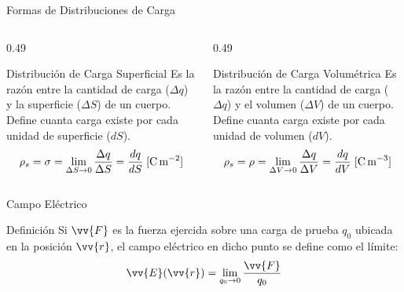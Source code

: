 \documentclass[10pt, aspectratio=169]{beamer}
\begin{document}
\begin{frame}{Formas de Distribuciones de Carga}

    \begin{columns}
        \begin{column}{0.49\textwidth}
            \begin{boxTeoria}{Distribución de Carga Superficial}
                Es la razón entre la cantidad de carga ($\Delta q$) y la superficie ($\Delta S$) de un cuerpo.
                Define cuanta carga existe por cada unidad de superficie ($dS$).
                \begin{equation*}
                    \rho_s = \sigma = \lim_{\Delta S\to 0}\frac{\Delta q}{\Delta S} = \frac{dq}{dS} \;[\unit{\C\per\m\squared}]
                \end{equation*}
            \end{boxTeoria}
        \end{column}
        \hfill
        \begin{column}{0.49\textwidth}
            \begin{boxTeoria}{Distribución de Carga Volumétrica}
                Es la razón entre la cantidad de carga ($\Delta q$) y el volumen ($\Delta V$) de un cuerpo.
                Define cuanta carga existe por cada unidad de volumen ($dV$).
                \begin{equation*}
                    \rho_s = \rho = \lim_{\Delta V\to 0}\frac{\Delta q}{\Delta V} = \frac{dq}{dV} \;[\unit{\C\per\m\cubed}]
                \end{equation*}
            \end{boxTeoria}
        \end{column}
    \end{columns}

\end{frame}

\begin{frame}{Campo Eléctrico}
    \begin{boxTeoria}{Definición}
        Si $\vv{F}$ es la fuerza ejercida sobre una carga de prueba $q_0$ ubicada en la posición $\vv{r}$, el campo eléctrico en dicho punto se define como el límite:
        \begin{equation*}
            \vv{E}(\vv{r}) = \lim_{q_0 \to 0} \frac{\vv{F}}{q_0}
        \end{equation*}
    \end{boxTeoria}
\end{frame}
\end{document}
